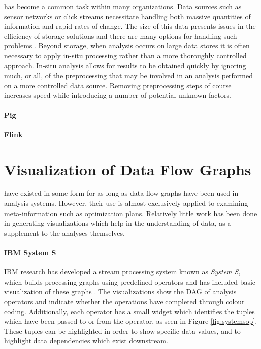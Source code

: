  has become a common task within many organizations. Data sources such as sensor networks or click streams necessitate handling both massive quantities of information and rapid rates of change. The size of this data presents issues in the efficiency of storage solutions and there are many options for handling such problems \cite{Klasky2011}. Beyond storage, when analysis occurs on large data stores it is often necessary to apply in-situ processing rather than a more thoroughly controlled approach. In-situ analysis allows for results to be obtained quickly by ignoring much, or all, of the preprocessing that may be involved in an analysis performed on a more controlled data source. Removing preprocessing steps of course increases speed while introducing a number of potential unknown factors.

\paragraph{Pig}

\paragraph{Flink}

\section{Visualization of Data Flow Graphs}
\label{sec:dfgviz}

 have existed in some form for as long as data flow graphs have been used in analysis systems. However, their use is almost exclusively applied to examining meta-information such as optimization plans. Relatively little work has been done in generating visualizations which help in the understanding of data, as a supplement to the analyses themselves.

\paragraph{IBM System S}
IBM research has developed a stream processing system known as \emph{System S}, which builds processing graphs using predefined operators \cite{Gedik2008} and has included basic visualization of these graphs \cite{Pauw2010}. The visualizations show the DAG of analysis operators and indicate whether the operations have completed through colour coding. Additionally, each operator has a small widget which identifies the tuples which have been passed to or from the operator, as seen in Figure \ref{fig:systemsop}. These tuples can be highlighted in order to show specific data values, and to highlight data dependencies which exist downstream.

